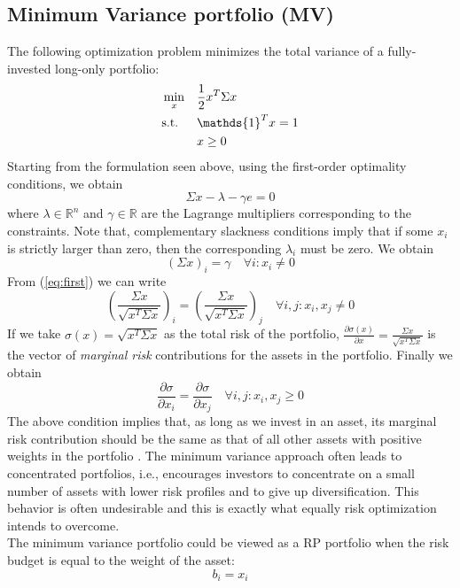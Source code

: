 \subsection{Minimum Variance portfolio (MV)}
The following optimization problem minimizes the total variance of a fully-invested long-only portfolio:
\begin{equation}
\begin{aligned}
& \min_x
&& \frac{1}{2}x^T \Sigma x\vspace{-0.8em}\\
&\text{s.t.}
&&\mathds{1}^T x =1\\
&&&x \geq 0
\end{aligned}
\end{equation}
Starting from the formulation seen above, using the first-order optimality conditions, we obtain
\begin{equation}
\Sigma x - \lambda - \gamma e = 0
\end{equation}
where $\lambda \in \mathbb{R}^n$ and $\gamma \in \mathbb{R}$ are the Lagrange multipliers corresponding to the constraints. Note that, complementary slackness conditions imply that if some $x_i$ is strictly larger than zero, then the corresponding $\lambda_i$ must be zero. We obtain
\begin{equation}\label{eq:first}
(\Sigma x)_i = \gamma \quad \forall i: x_i \neq 0
\end{equation}
From (\ref{eq:first}) we can write
\begin{equation}
\left(\frac{\Sigma x}{\sqrt{x^T \Sigma x}}\right)_i = \left(\frac{\Sigma x}{\sqrt{x^T \Sigma x}}\right)_j \quad \forall i,j: x_i,x_j \neq 0 
\end{equation}
If we take $\sigma (x) = \sqrt{x^T \Sigma x}$ as the total risk of the portfolio, $\frac{\partial\sigma (x)}{\partial x} = \frac{\Sigma x}{\sqrt{x^T \Sigma x}}$ is the vector of \textit{marginal risk} contributions for the assets in the portfolio. Finally we obtain
\begin{equation}\label{eq:erc1}
\frac{\partial\sigma}{\partial x_i} = \frac{\partial\sigma}{\partial x_j}\quad \forall i,j: x_i,x_j \geq 0
\end{equation}
The above condition implies that, as long as we invest in an asset, its marginal risk contribution should be the same as that of all other assets with positive weights in the portfolio \cite{tutuncu}. The minimum variance approach often leads to concentrated portfolios, i.e., encourages investors to concentrate on a small number of assets with lower risk profiles and to give up diversification. This behavior is often undesirable and this is exactly what equally risk optimization intends to overcome.\\
The minimum variance portfolio could be viewed as a RP portfolio when the risk budget is equal to the weight of the asset\footnotemark[2]:
\begin{equation*}
b_i = x_i
\end{equation*}

